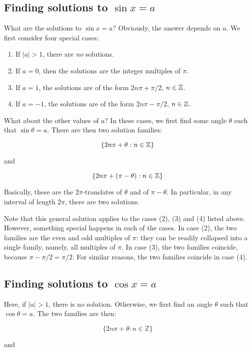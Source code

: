 \documentclass{amsart}
\begin{document}
\subsection{Finding solutions to $\sin x = a$}

What are the solutions to $\sin x = a$? Obviously, the answer depends
on $a$. We first consider four special cases:

\begin{enumerate}
\item If $|a| > 1$, there are {\em no} solutions.
\item If $a = 0$, then the solutions are the integer multiples of
  $\pi$.
\item If $a = 1$, the solutions are of the form $2n\pi + \pi/2$, $n
  \in \mathbb{Z}$.
\item If $a = -1$, the solutions are of the form $2n\pi - \pi/2$, $n
  \in \mathbb{Z}$.
\end{enumerate}

What about the other values of $a$? In these cases, we first find some
angle $\theta$ such that $\sin \theta = a$. There are then two solution families:

$$\{ 2n\pi + \theta : n \in \mathbb{Z} \}$$

and

$$\{ 2n\pi + (\pi - \theta) : n \in \mathbb{Z} \}$$

Basically, these are the $2\pi$-translates of $\theta$ and of $\pi -
\theta$. In particular, in any interval of length $2\pi$, there are
two solutions.  

Note that this general solution applies to the cases (2), (3) and (4)
listed above. However, something special happens in each of the
cases. In case (2), the two families are the even and odd multiples of
$\pi$: they can be readily collapsed into a single family, namely, all
multiples of $\pi$. In case (3), the two families coincide, because
$\pi - \pi/2 = \pi/2$. For similar reasons, the two families coincide
in case (4).

\subsection{Finding solutions to $\cos x = a$}

Here, if $|a| > 1$, there is no solution. Otherwise, we first find an
angle $\theta$ such that $\cos \theta = a$. The two families are then:

$$ \{ 2n \pi + \theta : n \in \mathbb{Z} \}$$

and
\end{document}
